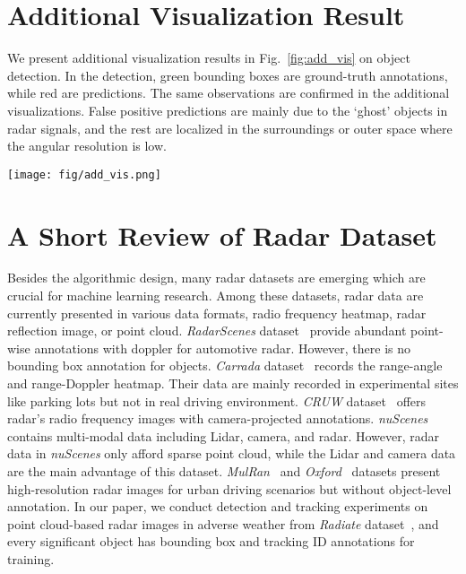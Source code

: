 \documentclass[10pt,twocolumn,letterpaper]{article}
\begin{document}
\section{Additional Visualization Result}

We present additional visualization results in Fig.~\ref{fig:add_vis} on object detection. In the detection, green bounding boxes are ground-truth annotations, while red are predictions. The same observations are confirmed in the additional visualizations. False positive predictions are mainly due to the `ghost' objects in radar signals, and the rest are localized in the surroundings or outer space where the angular resolution is low.

\begin{figure*}
    \centering
    \texttt{[image: fig/add\_vis.png]}
    \caption{Visualizations on object detection. From left to right and top to bottom, the figures are from: motorway-2-1, tiny foggy, junction-1-10, and fog-6-0. Green bounding boxes are ground-truth annotations, while red are model predictions from `Ours-ResNet18-w. TRL.'}
    \label{fig:add_vis}
\end{figure*}



\section{A Short Review of Radar Dataset}

Besides the algorithmic design, many radar datasets are emerging which are crucial for machine learning research. Among these datasets, radar data are currently presented in various data formats, \ie radio frequency heatmap, radar reflection image, or point cloud. \textit{RadarScenes} dataset~\cite{schumann2021radarscenes} provide abundant point-wise annotations with doppler for automotive radar. However, there is no bounding box annotation for objects. \textit{Carrada} dataset~\cite{ouaknine2021carrada} records the range-angle and range-Doppler heatmap. Their data are mainly recorded in experimental sites like parking lots but not in real driving environment. \textit{CRUW} dataset~\cite{wang2021rethinking} offers radar's radio frequency images with camera-projected annotations. \textit{nuScenes}~\cite{caesar2020nuscenes} contains multi-modal data including Lidar, camera, and radar. However, radar data in \textit{nuScenes} only afford sparse point cloud, while the Lidar and camera data are the main advantage of this dataset. \textit{MulRan}~\cite{kim2020mulran} and \textit{Oxford}~\cite{barnes2020oxford} datasets present high-resolution radar images for urban driving scenarios but without object-level annotation. In our paper, we conduct detection and tracking experiments on point cloud-based radar images in adverse weather from \textit{Radiate} dataset~\cite{sheeny2020radiate}, and every significant object has bounding box and tracking ID annotations for training.
\end{document}
